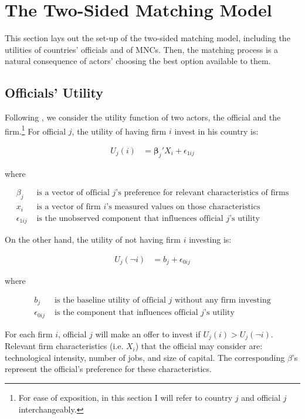 \section{The Two-Sided Matching Model}
\label{sec:model}

This section lays out the set-up of the two-sided matching model, including the utilities of countries' officials and of MNCs. Then, the matching process is a natural consequence of actors' choosing the best option available to them.

\subsection{Officials' Utility}

Following \citet{Logan1998}, we consider the utility function of two actors, the official and the firm.\footnote{For ease of exposition, in this section I will refer to country $j$ and official $j$ interchangeably.} For official $j$, the utility of having firm $i$ invest in his country is:

\begin{align}
U_j(i) &= \bm{\beta}_j' X_i + \epsilon_{1ij}
\end{align}

where

\begin{align*}
\beta_j &\text{ is a vector of official $j$'s preference for relevant characteristics of firms} \\
x_i &\text{ is a vector of firm $i$'s measured values on those characteristics} \\
\epsilon_{1ij} &\text{ is the unobserved component that influences official $j$'s utility}
\end{align*}

On the other hand, the utility of not having firm $i$ investing is:

\begin{align}
U_j(\neg i) &= b_j + \epsilon_{0ij}
\end{align}

where

\begin{align*}
b_j &\text{ is the baseline utility of official $j$ without any firm investing} \\
\epsilon_{0ij} &\text{ is the component that influences official $j$'s utility}
\end{align*}

For each firm $i$, official $j$ will make an offer to invest if $U_j(i) > U_j(\neg i)$. Relevant firm characteristics (i.e. $X_i$) that the official may consider are: technological intensity, number of jobs, and size of capital. The corresponding $\beta$'s represent the official's preference for these characteristics.

